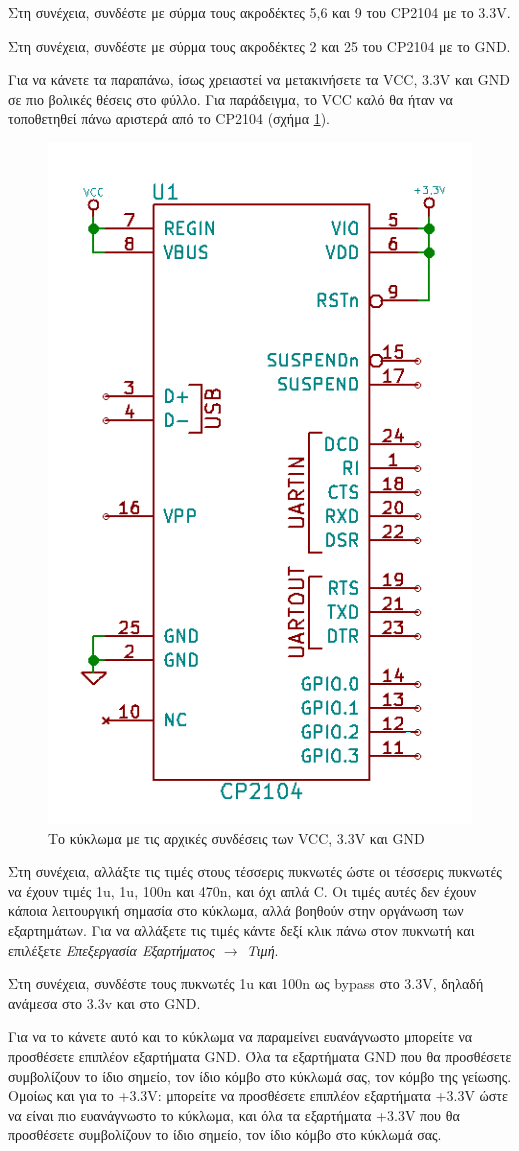 \documentclass[a4paper]{article}
\begin{document}
Στη συνέχεια, συνδέστε με σύρμα τους ακροδέκτες 5,6 και 9 του CP2104 με το 3.3V.

Στη συνέχεια, συνδέστε με σύρμα τους ακροδέκτες 2 και 25 του CP2104 με το GND.

Για να κάνετε τα παραπάνω, ίσως χρειαστεί να μετακινήσετε τα VCC, 3.3V και GND σε πιο βολικές θέσεις στο φύλλο. Για παράδειγμα, το VCC καλό θα ήταν να τοποθετηθεί πάνω αριστερά από το CP2104 (σχήμα \ref{fig:eesch-circ-initpwrconn}).

\begin{figure}
  \begin{center}
    \includegraphics[width=.35\textwidth]{img/eesch-circ-initpwrconn.png}
    \caption{Το κύκλωμα με τις αρχικές συνδέσεις των VCC, 3.3V και GND}
    \label{fig:eesch-circ-initpwrconn}
  \end{center}
\end{figure}

Στη συνέχεια, αλλάξτε τις τιμές στους τέσσερις πυκνωτές ώστε οι τέσσερις πυκνωτές να έχουν τιμές 1u, 1u, 100n και 470n, και όχι απλά C. Οι τιμές αυτές δεν έχουν κάποια λειτουργική σημασία στο κύκλωμα, αλλά βοηθούν στην οργάνωση των εξαρτημάτων. Για να αλλάξετε τις τιμές κάντε δεξί κλικ πάνω στον πυκνωτή και επιλέξετε \textit{Επεξεργασία Εξαρτήματος $\rightarrow$ Τιμή}.

Στη συνέχεια, συνδέστε τους πυκνωτές 1u και 100n ως bypass στο 3.3V, δηλαδή ανάμεσα στο 3.3v και στο GND. 

Για να το κάνετε αυτό και το κύκλωμα να παραμείνει ευανάγνωστο μπορείτε να προσθέσετε επιπλέον εξαρτήματα GND. Όλα τα εξαρτήματα GND που θα προσθέσετε συμβολίζουν το ίδιο σημείο, τον ίδιο κόμβο στο κύκλωμά σας, τον κόμβο της γείωσης. Ομοίως και για το +3.3V: μπορείτε να προσθέσετε επιπλέον εξαρτήματα +3.3V ώστε να είναι πιο ευανάγνωστο το κύκλωμα, και όλα τα εξαρτήματα +3.3V που θα προσθέσετε συμβολίζουν το ίδιο σημείο, τον ίδιο κόμβο στο κύκλωμά σας.
\end{document}
